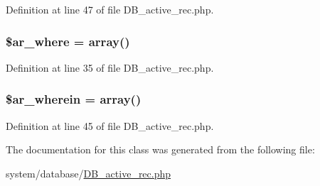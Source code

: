 Definition at line 47 of file D\-B\-\_\-active\-\_\-rec.\-php.

\hypertarget{class_c_i___d_b__active__record_acc294995d7d46cfa1c5e4377b1a691ec}{
\subsubsection[{\$ar\-\_\-where}]{\setlength{\rightskip}{0pt plus 5cm}\$ar\-\_\-where = array()}}\label{class_c_i___d_b__active__record_acc294995d7d46cfa1c5e4377b1a691ec}


Definition at line 35 of file D\-B\-\_\-active\-\_\-rec.\-php.

\hypertarget{class_c_i___d_b__active__record_ad2c99824b4b9114fd06caf4627dcd7a7}{
\subsubsection[{\$ar\-\_\-wherein}]{\setlength{\rightskip}{0pt plus 5cm}\$ar\-\_\-wherein = array()}}\label{class_c_i___d_b__active__record_ad2c99824b4b9114fd06caf4627dcd7a7}


Definition at line 45 of file D\-B\-\_\-active\-\_\-rec.\-php.



The documentation for this class was generated from the following file\-:\begin{DoxyCompactItemize}
\item 
system/database/\hyperlink{_d_b__active__rec_8php}{D\-B\-\_\-active\-\_\-rec.\-php}\end{DoxyCompactItemize}
